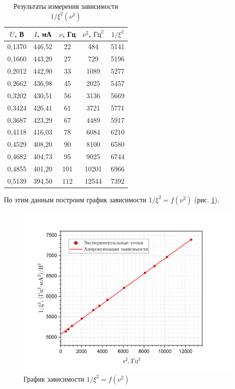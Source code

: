 \documentclass[a4paper, 12pt]{article}
\begin{document}
    \begin{table}[H]
        \centering
        \begin{tabular}{|c|c|c|c|c|}
        \hline
        $U$, В & $I$, мА & $\nu$, Гц & $\nu^2$, $\text{Гц}^2$ & $1/\xi^2$ \\ \hline
        0,1370 & 446,52 & 22 & 484 & 5141 \\ \hline
        0,1660 & 443,20 & 27 & 729 & 5196 \\ \hline
        0,2012 & 442,90 & 33 & 1089 & 5277 \\ \hline
        0,2662 & 436,98 & 45 & 2025 & 5457 \\ \hline
        0,3202 & 430,51 & 56 & 3136 & 5669 \\ \hline
        0,3424 & 426,41 & 61 & 3721 & 5771 \\ \hline
        0,3687 & 423,29 & 67 & 4489 & 5917 \\ \hline
        0,4118 & 416,03 & 78 & 6084 & 6210 \\ \hline
        0,4529 & 408,20 & 90 & 8100 & 6580 \\ \hline
        0,4682 & 404,73 & 95 & 9025 & 6744 \\ \hline
        0,4855 & 401,20 & 101 & 10201 & 6966 \\ \hline
        0,5139 & 394,50 & 112 & 12544 & 7392 \\ \hline
        \end{tabular}
        \caption{Результаты измерения зависимости $1/\xi^2 (\nu^2)$}
        \label{table:amplitude}
    \end{table}

    По этим данным построим график зависимости $1/\xi^2 = f(\nu^2)$ (рис. \ref{graph:xi}).

    \begin{figure}[H]
        \centering
        \includegraphics[width = 14 cm]{images/graph_xi.png}
        \caption{График зависимости $1/\xi^2 = f(\nu^2)$}
        \label{graph:xi}
    \end{figure}
\end{document}
